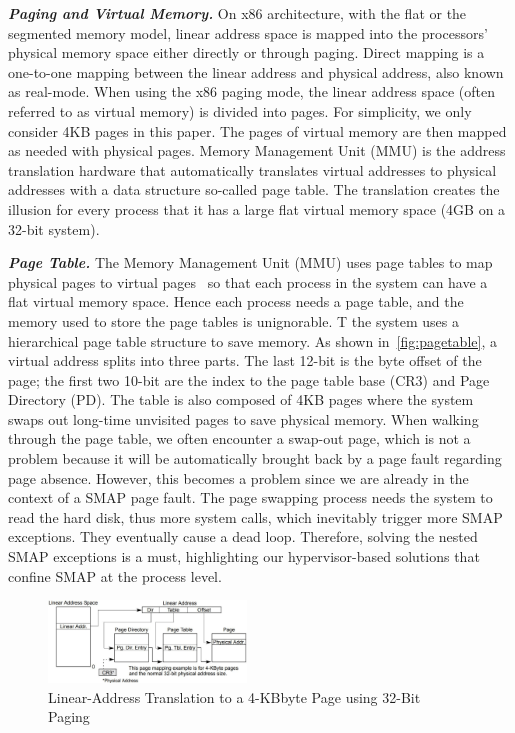 \textbf{\textit{Paging and Virtual Memory.}} On x86 architecture, with the flat or the segmented memory model, linear address space is mapped into the processors' physical memory space either directly or through paging.  Direct mapping is a one-to-one mapping between the linear address and physical address, also known as real-mode. When using the x86 paging mode, the linear address space (often referred to as virtual memory) is divided into pages. For simplicity, we only consider 4KB pages in this paper. The pages of virtual memory are then mapped as needed with physical pages. Memory Management Unit (MMU) is the address translation hardware that automatically translates virtual addresses to physical addresses with a data structure so-called page table. The translation creates the illusion for every process that it has a large flat virtual memory space (4GB on a 32-bit system). 



\textbf{\textit{Page Table.}} The Memory Management Unit (MMU) uses page tables to map physical pages to virtual pages~\cite{intelpaging} so that each process in the system can have a flat virtual memory space. Hence each process needs a page table, and the memory used to store the page tables is unignorable. T the system uses a hierarchical page table structure to save memory. As shown in~\autoref{fig:pagetable}, a virtual address splits into three parts. The last 12-bit is the byte offset of the page;  the first two 10-bit are the index to the page table base (CR3) and Page Directory (PD). The table is also composed of 4KB pages where the system swaps out long-time unvisited pages to save physical memory. When walking through the page table, we often encounter a swap-out page, which is not a problem because it will be automatically brought back by a page fault regarding page absence. However, this becomes a problem since we are already in the context of a SMAP page fault. The page swapping process needs the system to read the hard disk, thus more system calls, which inevitably trigger more SMAP exceptions. They eventually cause a dead loop.  Therefore, solving the nested SMAP exceptions is a must, highlighting our hypervisor-based solutions that confine SMAP at the process level.

\begin{figure}[th]
  \includegraphics[width=0.47\textwidth]{figures/pagetable}
  \centering
  \caption{Linear-Address Translation to a 4-KBbyte Page using 32-Bit Paging~\cite{intelpaging}}
  \label{fig:pagetable}
\end{figure}


